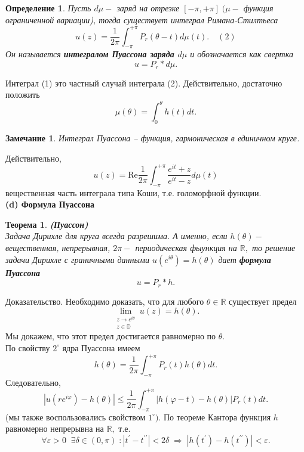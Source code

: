 \documentclass[12 pt, a4 paper]{article}
\theoremstyle{plain}   \newtheorem{Pro}{Задача}
\newtheorem{Def}{Определение}
\newtheorem{Rem}{Замечание}
\newtheorem{The}{Теорема}
\begin{document}
\begin{Def}
Пусть
$ d\mu - $
заряд на отрезке
$ [-\pi , +\pi ] \; ( \mu -  $
функция ограниченной вариации), тогда существует интеграл
Римана-Стилтьеса
$$
  u(z)=\frac{1}{2\pi}\int _{-\pi}^{+\pi}
  P_r (\theta -t )d\mu (t) . \quad (2)
$$
Он называется
{\bfseries интегралом Пуассона заряда
$ d\mu $ }
и обозначается как свертка
$$
  u=P_r \ast d\mu .
$$
\end{Def}
Интеграл (1) это частный случай интеграла (2).
Действительно, достаточно положить
$$
  \mu (\theta )=\int _0 ^{\theta} h(t)dt.
$$
\begin{Rem}
Интеграл Пуассона -- функция, гармоническая в единичном круге.
\end{Rem}
Действительно,
$$
  u(z)= \mathrm{Re} \frac{1}{2\pi}\int _{-\pi}^{+\pi}
  \frac{e^{it}+z}{e^{it}-z}d\mu (t)
$$
вещественная часть интеграла типа Коши, т.е. голоморфной функции.
\\
{\bfseries (d) Формула Пуассона}
\begin{The}
{\bfseries (Пуассон)}
\\
Задача Дирихле для круга всегда разрешима. А именно, если
$ h(\theta ) - $
вещественная, непрерывная,
$ 2\pi - $
периодическая фыункция на
$ \mathbb{R} , $
то решение задачи Дирихле с граничными данными
$ u(e^{i\theta})=h(\theta ) $
дает
{\bfseries формула Пуассона}
$$
  u=P_r \ast h.
$$
\end{The}
{\Large Доказательство.}
Необходимо доказать, что для любого
$ \theta \in \mathbb{R} $
существует предел
$$
  \lim _{\substack{z \rightarrow e^{i\theta}\\ z \in \mathbb{D}}}
   u(z)=h(\theta ).
$$
Мы докажем, что этот предел достигается равномерно по
$ \theta . $
\\
По свойству
$ 2^{\circ} $
ядра Пуассона имеем
$$
  h(\theta )=\frac{1}{2\pi}\int _{-\pi}^{+\pi}
  P_r (t)h(\theta )dt.
$$
Следовательно,
$$
  | u(re^{i \varphi})-h(\theta )| \leq \frac{1}{2\pi}
  \int _{-\pi}^{+\pi} |h(\varphi -t)-h(\theta )|P_r (t)dt.
$$
(мы также воспользовались свойством
$ 1^{\circ} ) . $
По теореме Кантора функция
$ h $
равномерно непрерывна на
$ \mathbb{R} , $
т.е.
$$
  \forall \varepsilon >0 \; \; \exists \delta \in (0,\pi ) \; :
  |t^{\prime}-t^{\prime \prime }|<2 \delta \; \Rightarrow \;
  |h(t^{\prime})-h(t^{\prime \prime})|< \varepsilon .
$$
\end{document}
